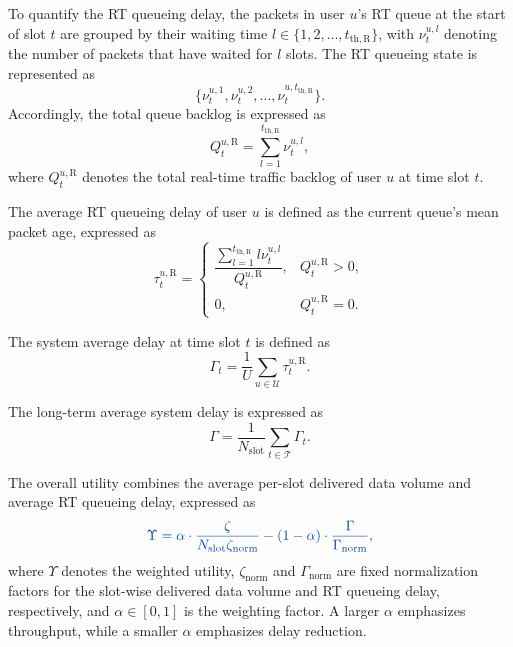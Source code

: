 \documentclass[journal]{IEEEtran}
\newcommand{\revbegin}[1]{\color{revisionblue}\ignorespaces}
\newcommand{\revend}[1]{\color{black}\ignorespaces}
\begin{document}
\revbegin{}To quantify the RT queueing delay, the packets in user $u$'s RT queue at the start of slot $t$ are grouped by their waiting time $l\in\{1,2,\ldots,t_{\mathrm{th},\mathrm{R}}\}$, with $\nu_t^{u,l}$ denoting the number of packets that have waited for $l$ slots. The RT queueing state is represented as\revend{}
\begin{equation}
\{\nu_t^{u,1},\nu_t^{u,2},\ldots,\nu_t^{u,t_{\mathrm{th},\mathrm{R}}}\}.
\end{equation}
Accordingly, the total queue backlog is expressed as
\begin{equation}
Q_t^{u,\mathrm{R}}=
\sum_{l=1}^{t_{\mathrm{th},\mathrm{R}}}\nu_t^{u,l},
\end{equation}
where $Q_t^{u,\mathrm{R}}$ denotes the total real-time traffic backlog of user $u$ at time slot $t$.

\revbegin{}The average RT queueing delay of user $u$ is defined as the current queue's mean packet age, expressed as\revend{}
\begin{equation}
\tau_t^{u,\mathrm{R}}=
\begin{cases}
\dfrac{\sum_{l=1}^{t_{\mathrm{th},\mathrm{R}}}l\nu_t^{u,l}}{Q_t^{u,\mathrm{R}}}, & Q_t^{u,\mathrm{R}}>0,\\
0, & Q_t^{u,\mathrm{R}}=0.
\end{cases}
\label{eq:rt-queue-age}
\end{equation}

The system average delay at time slot $t$ is defined as
\begin{equation}
\Gamma_t=
\frac{1}{U}
\sum_{u\in\mathcal{U}}\tau_t^{u,\mathrm{R}}.
\label{eq:system-queue-age}
\end{equation}

The long-term average system delay is expressed as
\begin{equation}
\Gamma=
\frac{1}{N_{\mathrm{slot}}}
\sum_{t\in\mathcal{T}}\Gamma_t.
\label{eq:long-term-queue-age}
\end{equation}

\revbegin{}The overall utility combines the average per-slot delivered data volume and average RT queueing delay, expressed as\revend{}
\begin{equation}\color{revisionblue}
\label{eq:p2-utility}
\Upsilon=
\alpha\cdot\frac{\zeta}{N_{\mathrm{slot}}\zeta_{\mathrm{norm}}}
-
(1-\alpha)\cdot\frac{\Gamma}{\Gamma_{\mathrm{norm}}},
\end{equation}
\revbegin{}where $\Upsilon$ denotes the weighted utility, $\zeta_{\mathrm{norm}}$ and $\Gamma_{\mathrm{norm}}$ are fixed normalization factors for the slot-wise delivered data volume and RT queueing delay, respectively, and $\alpha\in[0,1]$ is the weighting factor. A larger $\alpha$ emphasizes throughput, while a smaller $\alpha$ emphasizes delay reduction.\revend{}
\end{document}
